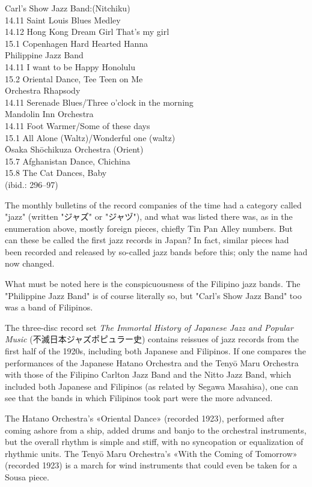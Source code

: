 \begin{listblock}
Carl's Show Jazz Band:(Nitchiku)\\
14.11 Saint Louis Blues Medley\\
14.12 Hong Kong Dream Girl That's my girl\\
15.1 Copenhagen Hard Hearted Hanna\\
Philippine Jazz Band\\
14.11 I want to be Happy Honolulu\\
15.2 Oriental Dance, Tee Teen on Me\\
Orchestra Rhapsody\\
14.11 Serenade Blues/Three o'clock in the morning\\
Mandolin Inn Orchestra\\
14.11 Foot Warmer/Some of these days\\
15.1 All Alone (Waltz)/Wonderful one (waltz)\\
Ōsaka Shōchikuza Orchestra (Orient)\\
15.7 Afghanistan Dance, Chichina\\
15.8 The Cat Dances, Baby\\
(ibid.: 296–97)
\end{listblock}

The monthly bulletins of the record companies of the time had a category called "jazz" (written "ジャズ" or "ジャヅ"), and what was listed there was, as in the enumeration above, mostly foreign pieces, chiefly Tin Pan Alley numbers. But can these be called the first jazz records in Japan? In fact, similar pieces had been recorded and released by so-called jazz bands before this; only the name had now changed.

What must be noted here is the conspicuousness of the Filipino jazz bands. The "Philippine Jazz Band" is of course literally so, but "Carl's Show Jazz Band" too was a band of Filipinos.

The three-disc record set \textit{The Immortal History of Japanese Jazz and Popular Music} (不滅日本ジャズポピュラー史) contains reissues of jazz records from the first half of the 1920s, including both Japanese and Filipinos. If one compares the performances of the Japanese Hatano Orchestra and the Tenyō Maru Orchestra with those of the Filipino Carlton Jazz Band and the Nitto Jazz Band, which included both Japanese and Filipinos (as related by Segawa Masahisa), one can see that the bands in which Filipinos took part were the more advanced.

The Hatano Orchestra's «Oriental Dance» (recorded 1923), performed after coming ashore from a ship, added drums and banjo to the orchestral instruments, but the overall rhythm is simple and stiff, with no syncopation or equalization of rhythmic units. The Tenyō Maru Orchestra's «With the Coming of Tomorrow» (recorded 1923) is a march for wind instruments that could even be taken for a Sousa piece.


